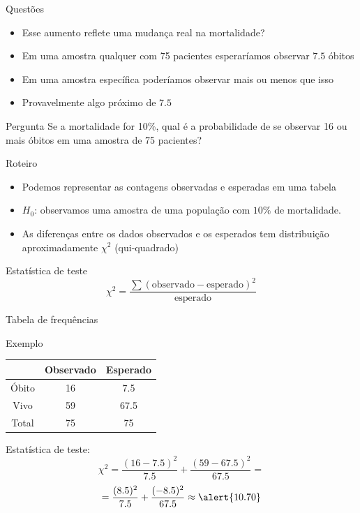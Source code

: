 \documentclass{beamer}
\begin{document}
\begin{frame}{\scriptsize Questões}
  \begin{itemize}
  \item Esse aumento reflete uma mudança real na mortalidade?
  \item Em uma amostra qualquer com 75 pacientes esperaríamos observar $7.5$ óbitos
  \item Em uma amostra específica poderíamos observar mais ou menos
    que isso
  \item Provavelmente algo próximo de $7.5$
  \end{itemize}

  \begin{block}{Pergunta}
    Se a mortalidade for 10\%, qual é a probabilidade de se observar
    16 ou mais óbitos em uma amostra de 75 pacientes?
  \end{block}
\end{frame}

\begin{frame}{\scriptsize Roteiro}
  \begin{itemize}
    \small
  \item Podemos representar as contagens observadas e esperadas em uma tabela
  \item $H_0$: \alert{observamos uma amostra de uma população com
      $10\%$ de mortalidade}.
  \item As diferenças entre os dados observados e os esperados tem
    distribuição aproximadamente $\chi^2$ (qui-quadrado)
  \end{itemize}
  \begin{block}{Estatística de teste}
    $$\chi^2 = \frac{\sum (\text{observado} - \text{esperado})^2 }{\text{esperado}}$$
  \end{block}
\end{frame}

\begin{frame}{\scriptsize Tabela de frequências}
  \begin{exampleblock}{Exemplo}
    \footnotesize
    \begin{tabular}{c|c|c}
      & Observado & Esperado\\
      \hline
      Óbito & 16 & 7.5 \\
      \hline
      Vivo & 59 & 67.5 \\
      \hline
      Total & 75 & 75\\
    \end{tabular}
  \end{exampleblock}

Estatística de teste:
  \begin{displaymath}
    \chi^2 = \frac{(16 - 7.5)^2}{7.5} + \frac{(59 - 67.5)^2}{67.5} =
  \end{displaymath}
  \begin{displaymath}
    = \frac{(8.5)^2}{7.5} + \frac{(-8.5)^2}{67.5} \approx \alert{10.70}
  \end{displaymath}
\end{frame}
\end{document}
